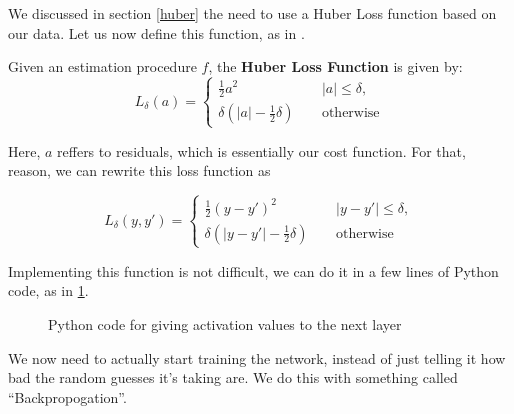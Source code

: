 We discussed in section \ref{huber} the need to use a Huber Loss function based on our data. Let us now define this function, as in \cite{huber}.

\begin{definition}
    Given an estimation procedure $f$, the \textbf{Huber Loss Function} is given by:
    \begin{equation*}
        L_{\delta}(a) = \begin{cases}
            \frac{1}{2}a^2  \quad \, &\lvert a \rvert \leq \delta, \\
            \delta(\lvert a \rvert -\frac{1}{2}\delta)  \quad\, &\text{otherwise}
        \end{cases}
    \end{equation*}
\end{definition}

Here, $a$ reffers to residuals, which is essentially our cost function. For that, reason, we can rewrite this loss function as 

\begin{equation}
    L_{\delta}(y,y') = \begin{cases}
        \frac{1}{2}(y-y')^2 \quad \, &\lvert y-y' \rvert \leq \delta, \\
        \delta(\lvert y-y' \rvert -\frac{1}{2}\delta) \quad \, &\text{otherwise}
    \end{cases}
\end{equation}

Implementing this function is not difficult, we can do it in a few lines of Python code, as in \ref{hubercode}.

\begin{figure}[h]%
    
    \caption{Python code for giving activation values to the next layer}
    \label{hubercode}
\end{figure}

We now need to actually start training the network, instead of just telling it how bad the random guesses it's taking are. We do this with
something called ``Backpropogation''.